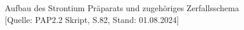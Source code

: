 \documentclass{article}
\begin{document}
\begin{figure}[!h]
    \centering
    \caption{Aufbau des Strontium Präparats und zugehöriges Zerfallsschema [Quelle: PAP2.2 Skript, S.82, Stand: 01.08.2024]}
    \label{fig:Anhang-Strontium}
\end{figure}
\end{document}
